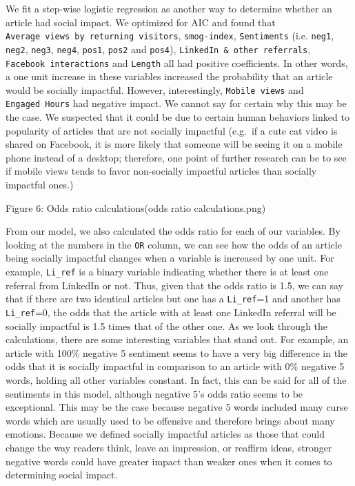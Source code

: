 \documentclass[10pt,letterpaper]{article}
\begin{document}
We fit a step-wise logistic regression as another way to determine
whether an article had social impact. We optimized for AIC and found
that \texttt{Average\ views\ by\ returning\ visitors},
\texttt{smog-index}, \texttt{Sentiments} (i.e. \texttt{neg1},
\texttt{neg2}, \texttt{neg3}, \texttt{neg4}, \texttt{pos1},
\texttt{pos2} and \texttt{pos4}),
\texttt{LinkedIn\ \&\ other\ referrals}, \texttt{Facebook\ interactions}
and \texttt{Length} all had positive coefficients. In other words, a one
unit increase in these variables increased the probability that an
article would be socially impactful. However, interestingly,
\texttt{Mobile\ views} and \texttt{Engaged\ Hours} had negative impact.
We cannot say for certain why this may be the case. We suspected that it
could be due to certain human behaviors linked to popularity of articles
that are not socially impactful (e.g.~if a cute cat video is shared on
Facebook, it is more likely that someone will be seeing it on a mobile
phone instead of a desktop; therefore, one point of further research can
be to see if mobile views tends to favor non-socially impactful articles
than socially impactful ones.)

Figure 6: Odds ratio calculations(odds ratio calculations.png)

From our model, we also calculated the odds ratio for each of our
variables. By looking at the numbers in the \texttt{OR} column, we can
see how the odds of an article being socially impactful changes when a
variable is increased by one unit. For example, \texttt{Li\_ref} is a
binary variable indicating whether there is at least one referral from
LinkedIn or not. Thus, given that the odds ratio is 1.5, we can say that
if there are two identical articles but one has a \texttt{Li\_ref}=1 and
another has \texttt{Li\_ref}=0, the odds that the article with at least
one LinkedIn referral will be socially impactful is 1.5 times that of
the other one. As we look through the calculations, there are some
interesting variables that stand out. For example, an article with 100\%
negative 5 sentiment seems to have a very big difference in the odds
that it is socially impactful in comparison to an article with 0\%
negative 5 words, holding all other variables constant. In fact, this
can be said for all of the sentiments in this model, although negative
5's odds ratio seems to be exceptional. This may be the case because
negative 5 words included many curse words which are usually used to be
offensive and therefore brings about many emotions. Because we defined
socially impactful articles as those that could change the way readers
think, leave an impression, or reaffirm ideas, stronger negative words
could have greater impact than weaker ones when it comes to determining
social impact.
\end{document}
